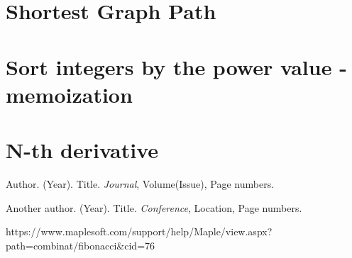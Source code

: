 \documentclass{article}
\begin{document}
\section{Shortest Graph Path}

\section{Sort integers by the power value - memoization}

\section{N-th derivative}

\begin{thebibliography}{9}
Author. (Year). Title. \textit{Journal}, Volume(Issue), Page numbers.

Another author. (Year). Title. \textit{Conference}, Location, Page numbers.

https://www.maplesoft.com/support/help/Maple/view.aspx?path=combinat/fibonacci\&cid=76

\end{thebibliography}
\end{document}
